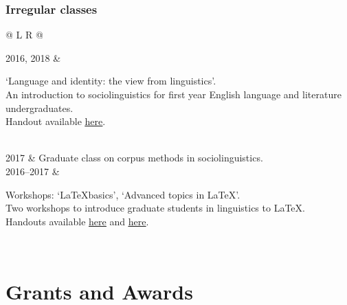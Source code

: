 \documentclass[11pt,a4paper]{article}
\makeatletter
\newcommand{\datewidth}{0.15}
\newcommand{\bodywidth}{0.82}
\newenvironment{cvsection}{%
  \setlength{\extrarowheight}{0.70ex}
  \begin{longtable}[l]{@{} L R @{}}
}{%
  \end{longtable}
}
\newcommand{\Note}[2]{%
\parbox[t]{\bodywidth\textwidth}{#1\\[-0.15em]{\footnotesize #2}}%
}
\makeatother
\begin{document}
\subsubsection*{Irregular classes}
\begin{cvsection}
    2016, 2018	& \Note{%
                  `Language and identity: the view from linguistics'.}
                  {An introduction to sociolinguistics for first year English language and literature undergraduates.\\
                  Handout available \href{http://users.ox.ac.uk/~sjoh2787/socio_presentation.pdf}{\uline{here}}.}\\
    2017        & Graduate class on corpus methods in sociolinguistics.\\
    2016--2017	& \Note{%
                  Workshops: `\LaTeX* basics', `Advanced topics in \LaTeX*'.}
                  {Two workshops to introduce graduate students in linguistics to \LaTeX*.\\
                  Handouts available \href{http://users.ox.ac.uk/~sjoh2787/latex-basics.pdf}{\uline{here}} and \href{http://users.ox.ac.uk/~sjoh2787/latex-advanced-topics.pdf}{\uline{here}}.}\\
\end{cvsection}


\section*{Grants and Awards}
\end{document}
